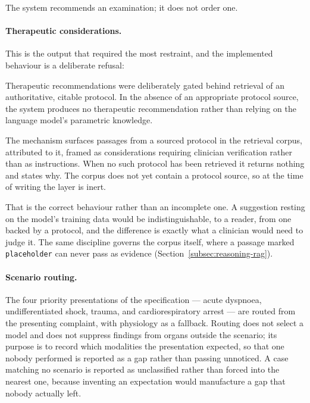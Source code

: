 The system recommends an examination; it does not order one.

\paragraph{Therapeutic considerations.} This is the output that required the most restraint,
and the implemented behaviour is a deliberate refusal:

\begin{keystatement}
Therapeutic recommendations were deliberately gated behind retrieval of an authoritative,
citable protocol. In the absence of an appropriate protocol source, the system produces no
therapeutic recommendation rather than relying on the language model's parametric knowledge.
\end{keystatement}

The mechanism surfaces passages from a sourced protocol in the retrieval corpus, attributed to
it, framed as considerations requiring clinician verification rather than as instructions. When
no such protocol has been retrieved it returns nothing and states why. The corpus does not yet
contain a protocol source, so at the time of writing the layer is inert.

That is the correct behaviour rather than an incomplete one. A suggestion resting on the
model's training data would be indistinguishable, to a reader, from one backed by a protocol,
and the difference is exactly what a clinician would need to judge it. The same discipline
governs the corpus itself, where a passage marked \texttt{placeholder} can never pass as
evidence (Section~\ref{subsec:reasoning-rag}).

\paragraph{Scenario routing.} The four priority presentations of the specification --- acute
dyspnoea, undifferentiated shock, trauma, and cardiorespiratory arrest --- are routed from the
presenting complaint, with physiology as a fallback. Routing does not select a model and does
not suppress findings from organs outside the scenario; its purpose is to record which
modalities the presentation expected, so that one nobody performed is reported as a gap rather
than passing unnoticed. A case matching no scenario is reported as unclassified rather than
forced into the nearest one, because inventing an expectation would manufacture a gap that
nobody actually left.

